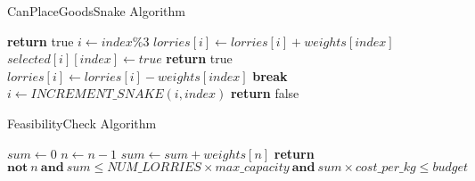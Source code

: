 \documentclass{article}
\begin{document}
\begin{algorithm}
	\caption{CanPlaceGoodsSnake Algorithm}
	\label{algo:canplacegoods}
	\begin{algorithmic}[1]
		\State \textbf{return} true
		\EndIf
            \State$i \gets index\%3$
		\State $lorries[i] \gets lorries[i] + weights[index]$
            \State $selected[i][index] \gets true$
		\State \textbf{return} true
		\EndIf
		\State $lorries[i] \gets lorries[i] - weights[index]$
		\EndIf
		\State \textbf{break}
		\EndIf
  \State$ i \gets INCREMENT\_SNAKE(i,index)$
		\EndFor
		\State \textbf{return} false
		\EndFunction
	\end{algorithmic}
\end{algorithm}
\begin{algorithm}
	\caption{FeasibilityCheck Algorithm}
	\label{algo:feasibilitycheck}
	\begin{algorithmic}[1]
		\State $sum \gets 0$
            \State $n \gets n - 1$
            \State $sum \gets sum + weights[n]$
            \EndFor
		\State \textbf{return $\textbf{not} \ n \ \textbf{and} \  sum \leq NUM\_LORRIES \times max\_capacity \ \textbf{and} \   sum \times cost\_per\_kg \leq budget $}
		\EndFunction
	\end{algorithmic}
\end{algorithm}
\end{document}
